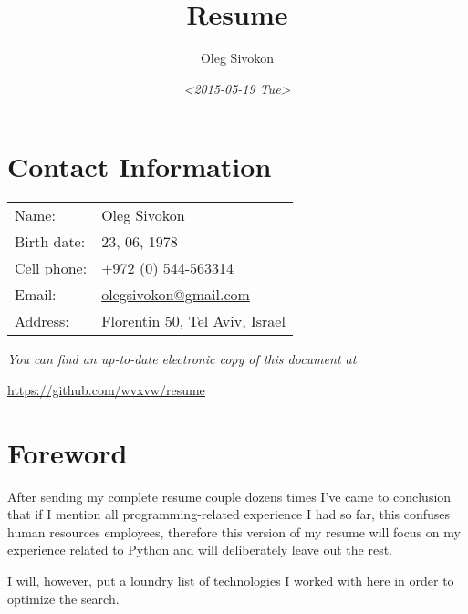 \documentclass[11pt]{article}
\author{Oleg Sivokon}
\date{\textit{<2015-05-19 Tue>}}
\title{Resume}
\begin{document}
\maketitle

\section{Contact Information}
\label{sec:orgheadline1}
\begin{center}
\begin{tabular}{ll}
Name: & Oleg Sivokon\\
Birth date: & 23, 06, 1978\\
Cell phone: & +972 (0) 544-563314\\
Email: & \href{mailto:olegsivokon@gmail.com}{olegsivokon@gmail.com}\\
Address: & Florentin 50, Tel Aviv, Israel\\
\end{tabular}
\end{center}

\emph{You can find an up-to-date electronic copy of this document at}

\url{https://github.com/wvxvw/resume}

\clearpage

\section{Foreword}
\label{sec:orgheadline2}
After sending my complete resume couple dozens times I've came to conclusion
that if I mention all programming-related experience I had so far, this
confuses human resources employees, therefore this version of my resume
will focus on my experience related to Python and will deliberately leave
out the rest.

I will, however, put a loundry list of technologies I worked with here in
order to optimize the search.
\end{document}
